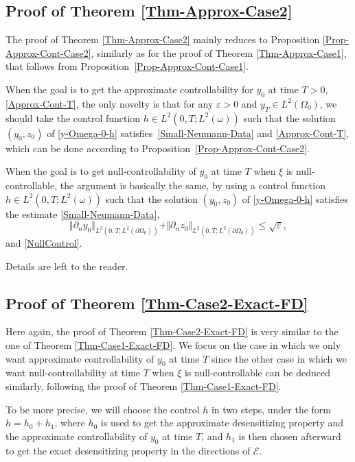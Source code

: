 \documentclass[JEP,XML,SOM,Unicode,NoFloatCountersInSection]{cedram}
\newcommand{\norm}[1]{\Vert#1\Vert}
\theoremstyle{definition}
\begin{document}
\subsection{Proof of Theorem \ref{Thm-Approx-Case2}}\label{Subsec-Proof-Approx-Case2}

The proof of Theorem \ref{Thm-Approx-Case2} mainly reduces to Proposition \ref{Prop-Approx-Cont-Case2}, similarly as for the proof of Theorem \ref{Thm-Approx-Case1}, that follows from Proposition~\ref{Prop-Approx-Cont-Case1}.

When the goal is to get the approximate controllability for $y_0$ at time $T>0$, \ie \eqref{Approx-Cont-T}, the only novelty is that for any $\varepsilon >0$ and $y_T\in L^2(\Omega_0)$, we should take the control function $h \in L^2(0,T; L^2(\omega))$ such that the solution $(y_0,z_0)$ of \eqref{y-Omega-0-h} satisfies~\eqref{Small-Neumann-Data} and \eqref{Approx-Cont-T}, which can be done according to Proposition~\ref{Prop-Approx-Cont-Case2}.

When the goal is to get null-controllability of $y_0$ at time $T$ when $\xi$ is null\nobreakdash-con\-trol\-lable, the argument is basically the same, by using a control function $h \in L^2(0,T; L^2(\omega))$ such that the solution $(y_0,z_0)$ of \eqref{y-Omega-0-h} satisfies the estimate \eqref{Small-Neumann-Data}, \ie
\[
\norm{\partial_n y_0}_{L^2(0,T;L^2(\partial\Omega_0))} + \norm{\partial_n z_0}_{L^2(0,T;L^2(\partial\Omega_0))}\leq \sqrt{\varepsilon}
,
\]
and \eqref{NullControl}.

Details are left to the reader.

\subsection{Proof of Theorem \ref{Thm-Case2-Exact-FD}}

Here again, the proof of Theorem \ref{Thm-Case2-Exact-FD} is very similar to the one of Theorem \ref{Thm-Case1-Exact-FD}. We focus on the case in which we only want approximate controllability of $y_0$ at time $T$ since the other case in which we want null-controllability at time $T$ when $\xi$ is null-controllable can be deduced similarly, following the proof of Theorem \ref{Thm-Case1-Exact-FD}.

{To be more precise, we will choose the control $h$ in two steps, under the form $h = h_0 + h_1$, where $h_0$ is used to get the approximate desensitizing property and the approximate controllability of $y_0$ at time $T$, and $h_1$ is then chosen afterward to get the exact desensitizing property in the directions of $\mathcal{E}$.}
\end{document}
